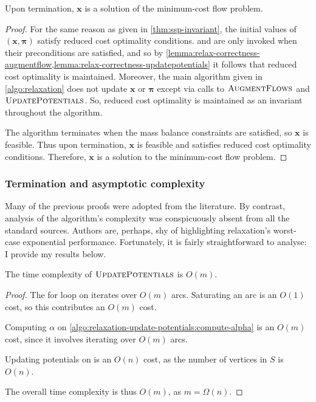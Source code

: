 \begin{thm}[Correctness] \label{thm:relax-correctness}
Upon termination, $\mathbf{x}$ is a solution of the minimum-cost flow problem.
\end{thm}
\begin{proof}
For the same reason as given in \cref{thm:ssp-invariant}, the initial values of $\left(\mathbf{x},\boldsymbol{\pi}\right)$ satisfy reduced cost optimality conditions.  and  are only invoked when their preconditions are satisfied, and so by \cref{lemma:relax-correctness-augmentflow,lemma:relax-correctness-updatepotentials} it follows that reduced cost optimality is maintained. Moreover, the main algorithm given in \cref{algo:relaxation} does not update $\mathbf{x}$ or $\boldsymbol{\pi}$ except via calls to $\textproc{AugmentFlows}$ and $\textproc{UpdatePotentials}$. So, reduced cost optimality is maintained as an invariant throughout the algorithm.

The algorithm terminates when the mass balance constraints are satisfied, so $\mathbf{x}$ is feasible. Thus upon termination, $\mathbf{x}$ is feasible and satisfies reduced cost optimality conditions. Therefore, $\mathbf{x}$ is a solution to the minimum-cost flow problem. 
\end{proof}

\subsubsection{Termination and asymptotic complexity}

Many of the previous proofs were adopted from the literature. By contrast, analysis of the algorithm's complexity was conspicuously absent from all the standard sources. Authors are, perhaps, shy of highlighting relaxation's worst-case exponential performance. Fortunately, it is fairly straightforward to analyse: I provide my results below. \\

\begin{lemma} \label{lemma:relax-complexity-updatepotentials}
The time complexity of $\textproc{UpdatePotentials}$ is $O(m)$.
\end{lemma}
\begin{proof}
The for loop on  iterates over $O(m)$ arcs. Saturating an arc is an $O(1)$ cost, so this contributes an $O(m)$ cost.

Computing $\alpha$ on \cref{algo:relaxation-update-potentials:compute-alpha} is an $O(m)$ cost, since it involves iterating over $O(m)$ arcs.

Updating potentials on  is an $O(n)$ cost, as the number of vertices in $S$ is $O(n)$.

The overall time complexity is thus $O(m)$, as $m = \Omega(n)$.
\end{proof}

